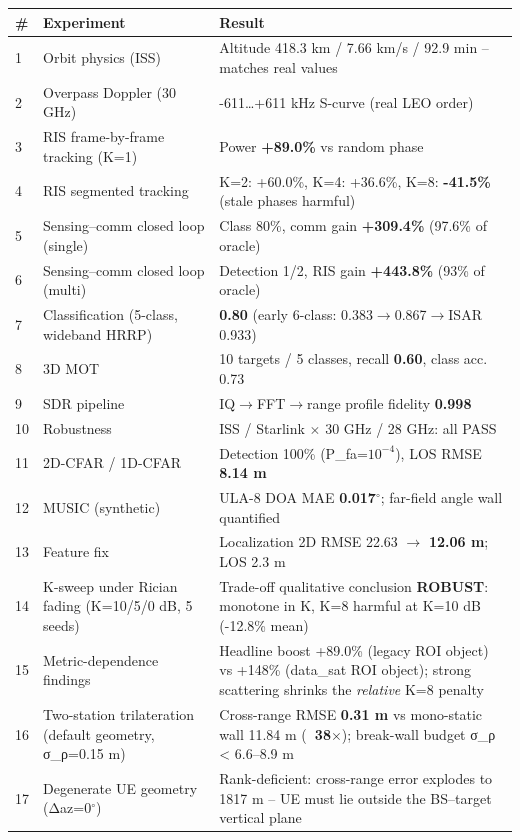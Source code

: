 \documentclass[11pt]{article}
\begin{document}
\begin{table}[ht]
\centering
\small
\begin{tabular}{lll}
\# & Experiment & Result \\
\hline
1 & Orbit physics (ISS) & Altitude 418.3 km / 7.66 km/s / 92.9 min -- matches real values \\
2 & Overpass Doppler (30 GHz) & -611\ldots+611 kHz S-curve (real LEO order) \\
3 & RIS frame-by-frame tracking (K=1) & Power \textbf{+89.0\%} vs random phase \\
4 & RIS segmented tracking & K=2: +60.0\%, K=4: +36.6\%, K=8: \textbf{-41.5\%} (stale phases harmful) \\
5 & Sensing--comm closed loop (single) & Class 80\%, comm gain \textbf{+309.4\%} (97.6\% of oracle) \\
6 & Sensing--comm closed loop (multi) & Detection 1/2, RIS gain \textbf{+443.8\%} (93\% of oracle) \\
7 & Classification (5-class, wideband HRRP) & \textbf{0.80} (early 6-class: 0.383$\rightarrow$0.867$\rightarrow$ISAR 0.933) \\
8 & 3D MOT & 10 targets / 5 classes, recall \textbf{0.60}, class acc. 0.73 \\
9 & SDR pipeline & IQ$\rightarrow$FFT$\rightarrow$range profile fidelity \textbf{0.998} \\
10 & Robustness & ISS / Starlink $\times$ 30 GHz / 28 GHz: all PASS \\
11 & 2D-CFAR / 1D-CFAR & Detection 100\% (P\_fa=$10^{-4}$), LOS RMSE \textbf{8.14 m} \\
12 & MUSIC (synthetic) & ULA-8 DOA MAE \textbf{0.017$^\circ$}; far-field angle wall quantified \\
13 & Feature fix & Localization 2D RMSE 22.63 $\rightarrow$ \textbf{12.06 m}; LOS 2.3 m \\
14 & K-sweep under Rician fading (K=10/5/0 dB, 5 seeds) & Trade-off qualitative conclusion \textbf{ROBUST}: monotone in K, K=8 harmful at K=10 dB (-12.8\% mean) \\
15 & Metric-dependence findings & Headline boost +89.0\% (legacy ROI object) vs +148\% (data\_sat ROI object); strong scattering shrinks the \textit{relative} K=8 penalty \\
16 & Two-station trilateration (default geometry, σ\_ρ=0.15 m) & Cross-range RMSE \textbf{0.31 m} vs mono-static wall 11.84 m (\textbf{~38$\times$}); break-wall budget σ\_ρ < 6.6--8.9 m \\
17 & Degenerate UE geometry (Δaz=0$^\circ$) & Rank-deficient: cross-range error explodes to 1817 m -- UE must lie outside the BS--target vertical plane \\
\hline
\end{tabular}
\end{table}
\end{document}
